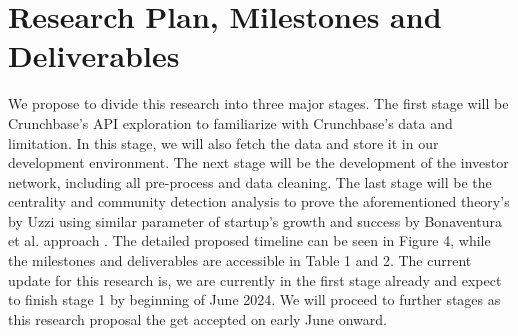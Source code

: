 \documentclass[a4paper,11pt]{article}
\begin{document}
\section{Research Plan, Milestones and Deliverables}

We propose to divide this research into three major stages. The first stage will be Crunchbase's API exploration to familiarize with Crunchbase's data and limitation. In this stage, we will also fetch the data and store it in our development environment. The next stage will be the development of the investor network, including all pre-process and data cleaning. The last stage will be the centrality and community detection analysis to prove the aforementioned theory's by Uzzi \cite{uzzi2021a} using similar parameter of startup's growth and success by Bonaventura et al. approach \cite{bonaventura2020a}. The detailed proposed timeline can be seen in Figure 4, while the milestones and deliverables are accessible in Table 1 and 2. The current update for this research is, we are currently in the first stage already and expect to finish stage 1 by beginning of June 2024. We will proceed to further stages as this research proposal the get accepted on early June onward.

\end{document}
